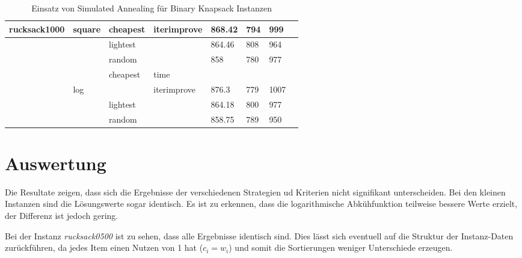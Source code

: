 \documentclass[11pt,a4paper]{article}
\begin{document}
\begin{table}[!t]
\begin{tabular}{ | l | l | l | l | l | l | l | l | }
        rucksack1000 & square & cheapest & iterimprove & 868.42 & 794 & 999 \\ \hline
        &            & lightest & & 864.46 & 808 & 964 \\ \hline
        &            & random & & \textcolor{BrickRed}{858} & 780 & 977 \\ \hline
        &            & cheapest & time &  &  &  \\ \hline
        & log        & & iterimprove & \textcolor{OliveGreen}{876.3} & 779 & \textcolor{OliveGreen}{1007} \\ \hline
        &            & lightest & & 864.18 & 800 & 977 \\ \hline
        &            & random & & 858.75 & 789 & \textcolor{BrickRed}{950} \\ \hline
  \end{tabular}
    \caption{Einsatz von Simulated Annealing für Binary Knapsack Instanzen}
    \label{tab:results}
\end{table}

\clearpage

\section{Auswertung}

Die Resultate zeigen, dass sich die Ergebnisse der verschiedenen Strategien ud Kriterien nicht signifikant unterscheiden. Bei den kleinen Instanzen sind die Lösungswerte sogar identisch. Es ist zu erkennen, dass die logarithmische Abkühfunktion teilweise bessere Werte erzielt, der Differenz ist jedoch gering.

Bei der Instanz \textit{rucksack0500} ist zu sehen, dass alle Ergebnisse identisch sind. Dies lässt sich eventuell auf die Struktur der Instanz-Daten zurückführen, da jedes Item einen Nutzen von 1 hat (\(c_i = w_i\)) und somit die Sortierungen weniger Unterschiede erzeugen.
\end{document}
